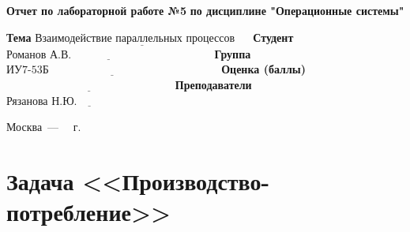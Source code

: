 \documentclass[12pt]{report}
\begin{document}
\begin{titlepage}
	
	\begin{center}
		\noindent\begin{minipage}{1.3\textwidth}\centering
			\Large\textbf{  Отчет по лабораторной работе №5}\newline
			\textbf{по дисциплине "Операционные системы"}\newline\newline
		\end{minipage}
	\end{center}
	
	\noindent\textbf{Тема} $\underline{\text{Взаимодействие параллельных процессов~~~~}}$\newline\newline
	\noindent\textbf{Студент} $\underline{\text{Романов А.В.~~~~~~~~~~~~~~~~~~~~~~~~~~~~~~~~~~~~~~}}$\newline\newline
	\noindent\textbf{Группа} $\underline{\text{ИУ7-53Б~~~~~~~~~~~~~~~~~~~~~~~~~~~~~~~~~~~~~~~~~~~~~~}}$\newline\newline
	\noindent\textbf{Оценка (баллы)} $\underline{\text{~~~~~~~~~~~~~~~~~~~~~~~~~~~~~~~~~~~~~~~~~~~~~}}$\newline\newline
	\noindent\textbf{Преподаватели} $\underline{\text{Рязанова Н.Ю.~~~~~~~~~~~~~~~~~~~~~~~~~~}}$\newline\newline\newline
	
	\begin{center}
		\vfill
		Москва~---~\the\year
		~г.
	\end{center}
\end{titlepage}

\newpage

\chapter{Задача <<Производство-потребление>>}
\end{document}
